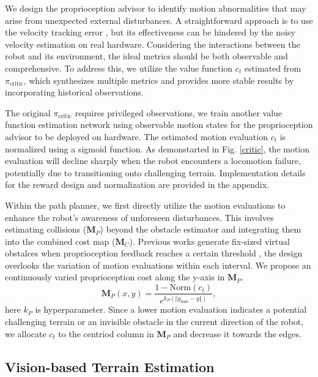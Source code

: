 \documentclass[conference]{IEEEtran}
\begin{document}
{We design the proprioception advisor to identify motion abnormalities that may arise from unexpected external disturbances. A straightforward approach is to use the velocity tracking error \cite{frey2023fast}, but its effectiveness can be hindered by the noisy velocity estimation on real hardware. Considering the interactions between the robot and its environment, the ideal metrics should be both observable and comprehensive. To address this, we utilize the value function $c_t$ estimated from $\pi_{\textrm{critic}}$, which synthesizes multiple metrics and provides more stable results by incorporating historical observations.}

{The original $\pi_{\textrm{critic}}$ requires privileged observations, we train another value function estimation network using observable motion states for the proprioception advisor to be deployed on hardware. The estimated motion evaluation $c_t$ is normalized using a sigmoid function.  As demonstarted in Fig. \ref{critic}, the motion evaluation will decline sharply when the robot encounters a locomotion failure, potentially due to transitioning onto challenging terrain. Implementation details for the reward design and normalization are provided in the appendix.}

{Within the path planner, we first directly utilize the motion evaluations to enhance the robot's awareness of unforeseen disturbances.} This involves estimating collisions ($\bm{M}_P$) beyond the obstacle estimator and integrating them into the combined cost map ($\bm{M}_C$). {Previous works generate fix-sized virtual obstalces when proprioception feedback reaches a certain threshold \cite{fu2022coupling}, the design overlooks the variation of motion evaluations within each interval. We propose an continuously varied proprioception cost along the y-axis in $\bm{M}_P$}.
\begin{equation}
       {\bm{M}_P}(x,y)=\frac{1-\textrm{Norm}(c_{t})}{e^{k_{P}(\Vert y_\textrm{base}-y \Vert)}},
\end{equation}
here $k_P$ is hyperparameter. Since a lower motion evaluation indicates a potential challenging terrain or an invisible obstacle in the current direction of the robot, we allocate $c_{t}$ to the {centriod column in ${\bm{M}_P}$ and decrease it towards the edges.} 

\subsection{Vision-based Terrain Estimation}
\end{document}
